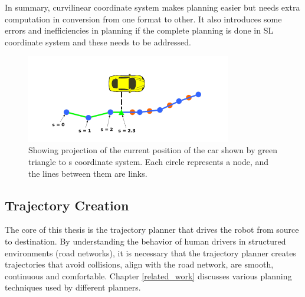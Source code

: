  In summary, curvilinear coordinate system makes planning easier but needs extra computation in conversion from one format to other. It also introduces some errors and inefficiencies in planning if the complete planning is done in SL coordinate system and these needs to be addressed. 
 
 \begin{figure}[H]
    \centering
    \includegraphics[width=0.8\textwidth]{Images/xy_sl_conversion.png}
    \caption{Showing projection of the current position of the car shown by green triangle to s coordinate system. Each circle represents a node, and the lines between them are links. \cite{volvo_reactive_traj}}
    \label{xy_sl_conversion}
\end{figure}


\subsection{ Trajectory Creation} \label{traj_creation}

The core of this thesis is the trajectory planner that drives the robot from source to destination. By understanding the behavior of human drivers in structured environments (road networks), it is necessary that the trajectory planner creates trajectories that avoid collisions, align with the road network, are smooth, continuous and comfortable. Chapter \ref{related_work} discusses various planning techniques used by different planners. 


